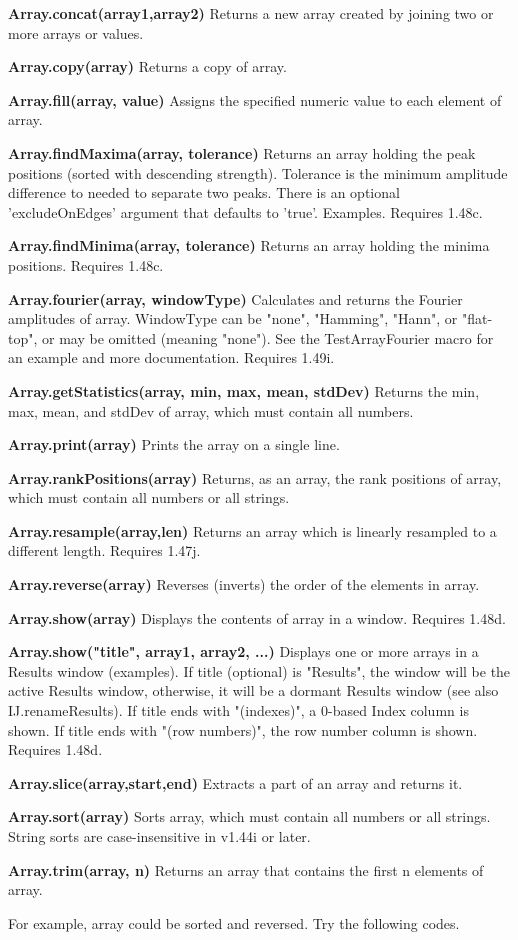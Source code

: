 \begin{shaded}
\begin{indentCom}
\item \textbf{Array.concat(array1,array2)} Returns a new array created by
joining two or more arrays or values. 
\item \textbf{Array.copy(array)} Returns a copy of array. 
\item \textbf{Array.fill(array, value)} Assigns the specified numeric value to
each element of array.
\item \textbf{Array.findMaxima(array, tolerance)} Returns an array holding the peak positions (sorted with descending strength). Tolerance is the minimum amplitude difference to needed to separate two peaks. There is an optional 'excludeOnEdges' argument that defaults to 'true'. Examples. Requires 1.48c.
\item \textbf{Array.findMinima(array, tolerance)} Returns an array holding the minima positions. Requires 1.48c.
\item \textbf{Array.fourier(array, windowType)} Calculates and returns the Fourier amplitudes of array. WindowType can be "none", "Hamming", "Hann", or "flat-top", or may be omitted (meaning "none"). See the TestArrayFourier macro for an example and more documentation. Requires 1.49i. 
\item \textbf{Array.getStatistics(array, min, max, mean, stdDev)} Returns the
min, max, mean, and stdDev of array, which must contain all numbers.
\item \textbf{Array.print(array)} Prints the array on a single line. 
\item \textbf{Array.rankPositions(array)} Returns, as an array, the rank
positions of array, which must contain all numbers or all strings. 
\item \textbf{Array.resample(array,len)} Returns an array which is linearly resampled to a different length. Requires 1.47j. 
\item \textbf{Array.reverse(array)} Reverses (inverts) the order of the
elements in array. 
\item \textbf{Array.show(array)} Displays the contents of array in a window. Requires 1.48d.
\item \textbf{Array.show("title", array1, array2, ...)} Displays one or more arrays in a Results window (examples). If title (optional) is "Results", the window will be the active Results window, otherwise, it will be a dormant Results window (see also IJ.renameResults). If title ends with "(indexes)", a 0-based Index column is shown. If title ends with "(row numbers)", the row number column is shown. Requires 1.48d. 
\item \textbf{Array.slice(array,start,end)} Extracts a part of an array and
returns it. 
\item \textbf{Array.sort(array)} Sorts array, which must contain all numbers
or all strings. String sorts are case-insensitive in v1.44i or later.
\item \textbf{Array.trim(array, n)} Returns an array that contains the first n
elements of array.
\end{indentCom}\end{shaded}

For example, array could be sorted and reversed. Try the following codes.